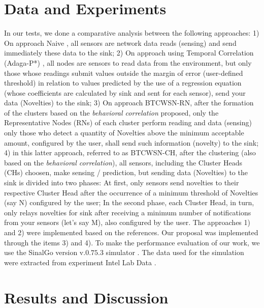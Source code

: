 \documentclass[conference]{IEEEtran}
\begin{document}
\section{Data and Experiments}
\label{Data and Experiments}
In our tests, we done a comparative analysis between the following approaches:
1) On approach Naive \cite{Madden2005}, all sensors are network data reads
(sensing) and send immediately these data to the sink; 2) On approach using
Temporal Correlation (Adaga-P*) \cite{Brayner2011}, all nodes are sensors to
read data from the environment, but only those whose readings submit values
outside the margin of error (user-defined threshold) in relation to values
predicted by the use of a regression equation (whose coefficients are calculated
by sink and sent for each sensor), send your data (Novelties) to the sink; 3) On
approach BTCWSN-RN, after the formation of the clusters based on the
\textit{behavioral correlation} proposed, only the Representative Nodes (RNs) of
each cluster perform reading and data (sensing) only those who detect a quantity
of Novelties above the minimum acceptable amount, configured by the user, shall
send such information (novelty) to the sink; 4) in this latter approach,
referred to as BTCWSN-CH, after the clustering (also based on the
\textit{behavioral correlation}), all sensors, including the Cluster Heads (CHs)
choosen, make sensing / prediction, but sending data (Novelties) to the sink is
divided into two phases: At first, only sensors send novelties to their
respective Cluster Head after the occurrence of a minimum threshold of Novelties
(say N) configured by the user; In the second phase, each Cluster Head, in turn,
only relays novelties for sink after receiving a minimum number of notifications
from your sensors (let's say M), also configured by the user.
The approaches 1) and 2) were implemented based on the references. Our proposal
was implemented through the items 3) and 4).
To make the performance evaluation of our work, we use the SinalGo version
v.$0.75.3$ simulator \cite{Sinalgo2007}. The data used for the simulation were
extracted from experiment Intel Lab Data \cite{Intel2004}.

\section{Results and Discussion}
\end{document}
